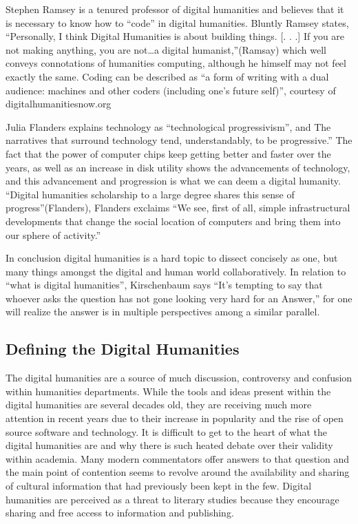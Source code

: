 \documentclass[]{article}
\begin{document}
Stephen Ramsey is a tenured professor of digital humanities and believes
that it is necessary to know how to ``code'' in digital humanities.
Bluntly Ramsey states, ``Personally, I think Digital Humanities is about
building things. {[}. . .{]} If you are not making anything, you are
not\ldots{}a digital humanist,''(Ramsay) which well conveys connotations
of humanities computing, although he himself may not feel exactly the
same. Coding can be described as ``a form of writing with a dual
audience: machines and other coders (including one's future self)'',
courtesy of digitalhumanitiesnow.org

Julia Flanders explains technology as ``technological progressivism'',
and The narratives that surround technology tend, understandably, to be
progressive.'' The fact that the power of computer chips keep getting
better and faster over the years, as well as an increase in disk utility
shows the advancements of technology, and this advancement and
progression is what we can deem a digital humanity. ``Digital humanities
scholarship to a large degree shares this sense of progress''(Flanders),
Flanders exclaims ``We see, first of all, simple infrastructural
developments that change the social location of computers and bring them
into our sphere of activity.''

In conclusion digital humanities is a hard topic to dissect concisely as
one, but many things amongst the digital and human world
collaboratively. In relation to ``what is digital humanities'',
Kirschenbaum says ``It's tempting to say that whoever asks the question
has not gone looking very hard for an Answer,'' for one will realize the
answer is in multiple perspectives among a similar parallel.

\subsection{Defining the Digital
Humanities}\label{defining-the-digital-humanities}

The digital humanities are a source of much discussion, controversy and
confusion within humanities departments. While the tools and ideas
present within the digital humanities are several decades old, they are
receiving much more attention in recent years due to their increase in
popularity and the rise of open source software and technology. It is
difficult to get to the heart of what the digital humanities are and why
there is such heated debate over their validity within academia. Many
modern commentators offer answers to that question and the main point of
contention seems to revolve around the availability and sharing of
cultural information that had previously been kept in the few. Digital
humanities are perceived as a threat to literary studies because they
encourage sharing and free access to information and publishing.
\end{document}

